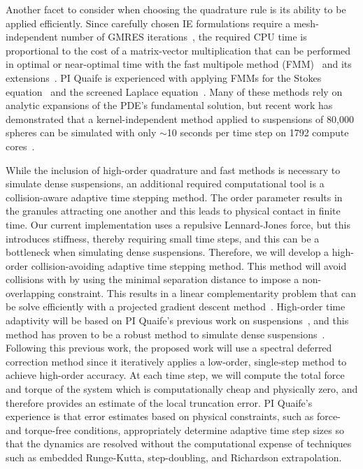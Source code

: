 Another facet to consider when choosing the quadrature rule is its
ability to be applied efficiently. Since carefully chosen IE
formulations require a mesh-independent number of GMRES
iterations~\cite{cam-ips-kel-mey-xue1996}, the required CPU time is
proportional to the cost of a matrix-vector multiplication that can be
performed in optimal or near-optimal time with the fast multipole method
(FMM)~\cite{fmm5} and its extensions~\cite{fmm1, fmm2, fmm3, fmm4, fmm6,
fmm7, ros-ols2016}. PI Quaife is experienced with applying FMMs for the
Stokes equation~\cite{qua-bir2014, bys-sha-qua2020} and the screened
Laplace equation~\cite{kro-qua2011, qua2011}. Many of these methods rely
on analytic expansions of the PDE's fundamental solution, but recent
work has demonstrated that a kernel-independent method applied to
suspensions of 80,000 spheres can be simulated with only $\sim$10
seconds per time step on 1792 compute cores~\cite{Yan2019}.

While the inclusion of high-order quadrature and fast methods is
necessary to simulate dense suspensions, an additional required
computational tool is a collision-aware adaptive time stepping method.
The order parameter results in the granules attracting one another and
this leads to physical contact in finite time. Our current
implementation uses a repulsive Lennard-Jones force, but this introduces
stiffness, thereby requiring small time steps, and this can be a
bottleneck when simulating dense suspensions. Therefore, we will develop
a high-order collision-avoiding adaptive time stepping method. This
method will avoid collisions with by using the minimal separation
distance to impose a non-overlapping constraint. This results in a
linear complementarity problem that can be solve efficiently with a
projected gradient descent method~\cite{Yan2019}. High-order time
adaptivity will be based on PI Quaife's previous work on
suspensions~\cite{qua-bir2016}, and this method has proven to be a
robust method to simulate dense suspensions~\cite{qua-vee-you2019,
kab-qua-bir2017, qua-gan-you2021}. Following this previous work, the
proposed work will use a spectral deferred correction method since it
iteratively applies a low-order, single-step method to achieve
high-order accuracy. At each time step, we will compute the total force
and torque of the system which is computationally cheap and physically
zero, and therefore provides an estimate of the local truncation error.
PI Quaife's experience is that error estimates based on physical
constraints, such as force- and torque-free conditions, appropriately
determine adaptive time step sizes so that the dynamics are resolved
without the computational expense of techniques such as embedded
Runge-Kutta, step-doubling, and Richardson extrapolation.

